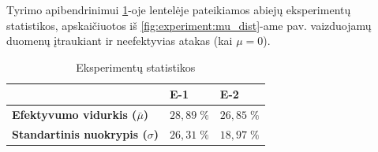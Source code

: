 Tyrimo apibendrinimui \ref{tab:experiment:stats}-oje lentelėje pateikiamos
abiejų eksperimentų statistikos, apskaičiuotos iš
\ref{fig:experiment:mu_dist}-ame pav. vaizduojamų duomenų įtraukiant ir
neefektyvias atakas (kai $\mu = 0$).

\begin{table}[h]
    \centering
    \begin{tabular}{l|l|l}
                                                   & \textbf{E-1} & \textbf{E-2} \\
        \midrule
        \textbf{Efektyvumo vidurkis ($\bar{\mu}$)} & $28,89 \; \%$   & $26,85 \; \%$   \\
        \textbf{Standartinis nuokrypis ($\sigma$)} & $26,31 \; \%$   & $18,97 \; \%$   \\
    \end{tabular}
    \caption{Eksperimentų statistikos}\label{tab:experiment:stats}
\end{table}
